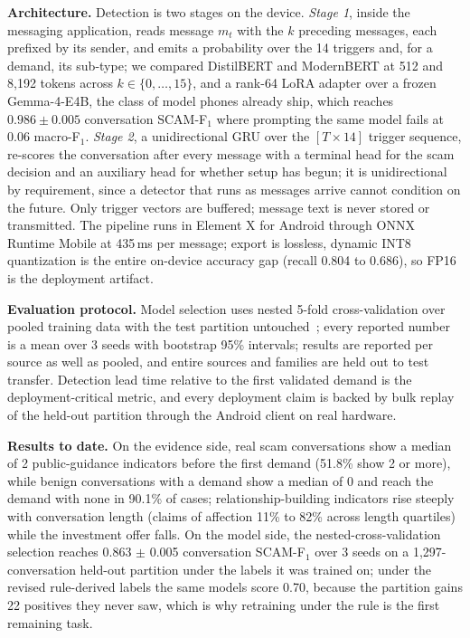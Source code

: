 \documentclass[letterpaper,11pt]{article}
\begin{document}
\textbf{Architecture.} Detection is two stages on the device.
\emph{Stage 1}, inside the messaging application, reads message $m_t$
with the $k$ preceding messages, each prefixed by its sender, and emits
a probability over the 14 triggers and, for a demand, its sub-type; we
compared DistilBERT and ModernBERT at 512 and 8,192 tokens across
$k \in \{0,\ldots,15\}$, and a rank-64 LoRA adapter over a frozen
Gemma-4-E4B, the class of model phones already ship, which reaches
$0.986 \pm 0.005$ conversation SCAM-F$_1$ where prompting the same model
fails at 0.06 macro-F$_1$. \emph{Stage 2}, a unidirectional GRU over the
$[T \times 14]$ trigger sequence, re-scores the conversation after every
message with a terminal head for the scam decision and an auxiliary
head for whether setup has begun; it is unidirectional by requirement,
since a detector that runs as messages arrive cannot condition on the
future. Only trigger vectors are buffered; message text is never stored
or transmitted. The pipeline runs in Element X for Android through
ONNX Runtime Mobile at 435\,ms per message; export is lossless, dynamic
INT8 quantization is the entire on-device accuracy gap (recall 0.804 to
0.686), so FP16 is the deployment artifact.

\textbf{Evaluation protocol.} Model selection uses nested 5-fold
cross-validation over pooled training data with the test partition
untouched~\cite{cawley2010overfitting,varma2006bias}; every reported
number is a mean over 3 seeds with bootstrap 95\% intervals; results
are reported per source as well as pooled, and entire sources and
families are held out to test transfer. Detection lead time relative to
the first validated demand is the deployment-critical metric, and every
deployment claim is backed by bulk replay of the held-out partition
through the Android client on real hardware.

\textbf{Results to date.} On the evidence side, real scam conversations
show a median of 2 public-guidance indicators before the first demand
(51.8\% show 2 or more), while benign conversations with a demand show
a median of 0 and reach the demand with none in 90.1\% of cases;
relationship-building indicators rise steeply with conversation length
(claims of affection 11\% to 82\% across length quartiles) while the
investment offer falls. On the model side, the nested-cross-validation
selection reaches 0.863 $\pm$ 0.005 conversation SCAM-F$_1$ over 3
seeds on a 1,297-conversation held-out partition under the labels it was
trained on; under the revised rule-derived labels the same models score
0.70, because the partition gains 22 positives they never saw, which is
why retraining under the rule is the first remaining task.
\end{document}
